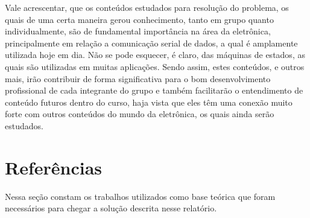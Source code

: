 \documentclass[12pt]{article}
\begin{document}
Vale acrescentar, que os conteúdos estudados para resolução do problema, os quais de uma certa maneira gerou conhecimento, tanto em grupo quanto individualmente, são de fundamental importância na área da eletrônica, principalmente em relação a comunicação serial de dados, a qual é amplamente utilizada hoje em dia. Não se pode esquecer, é claro, das máquinas de estados, as quais são utilizadas em muitas aplicações. Sendo assim, estes conteúdos, e outros mais, irão contribuir de forma significativa para o bom desenvolvimento profissional de cada integrante do grupo e também facilitarão o entendimento de conteúdo futuros dentro do curso, haja vista que eles têm uma conexão muito forte com outros conteúdos do mundo da eletrônica, os quais ainda serão estudados.


\section{Referências}

Nessa seção constam os trabalhos utilizados como base teórica que foram necessários para chegar a solução descrita nesse relatório.




\end{document}
